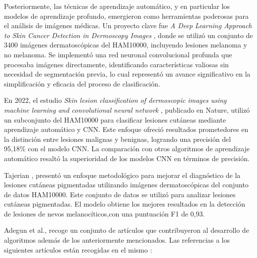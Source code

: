 Posteriormente, las técnicas de aprendizaje automático, y en particular los modelos de aprendizaje profundo, emergieron como herramientas poderosas para el análisis de imágenes médicas. Un proyecto clave fue \textit{A Deep Learning Approach to Skin Cancer Detection in Dermoscopy Images} , donde se utilizó un conjunto de 3400 imágenes dermatoscópicas del HAM10000, incluyendo lesiones melanoma y no melanoma. Se implementó una red neuronal convolucional profunda que procesaba imágenes directamente, identificando características valiosas sin necesidad de segmentación previa, lo cual representó un avance significativo en la simplificación y eficacia del proceso de clasificación.

En 2022, el estudio \textit{Skin lesion classification of dermoscopic images using machine learning and convolutional neural network} , publicado en Nature, utilizó un subconjunto del HAM10000 para clasificar lesiones cutáneas mediante aprendizaje automático y CNN. Este enfoque ofreció resultados prometedores en la distinción entre lesiones malignas y benignas, logrando una precisión del 95,18\% con el modelo CNN. La comparación con otros algoritmos de aprendizaje automático resaltó la superioridad de los modelos CNN en términos de precisión.

Tajerian ,  presentó un enfoque metodológico para mejorar el diagnóstico de la lesiones cutáneas pigmentadas utilizando imágenes dermatoscópicas del conjunto de datos HAM10000. Este conjunto de datos se utilizó para analizar lesiones cutáneas pigmentadas. El modelo obtiene los mejores resultados en la detección de lesiones de nevos melanocíticos,con una puntuación F1 de 0,93.

Adegun et al.,  recoge un conjunto de artículos que contribuyeron al desarrollo de algoritmos además de los anteriormente mencionados. Las referencias a los siguientes artículos están recogidas en el mismo :

